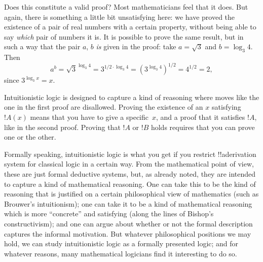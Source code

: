 \documentclass[../../../include/open-logic-chapter]{subfiles}
\begin{document}
Does this constitute a valid proof? Most mathematicians feel that it
does. But again, there is something a little bit unsatisfying here: we
have proved the existence of a pair of real numbers with a certain
property, without being able to say \emph{which} pair of numbers it
is.  It is possible to prove the same result, but in such a way that
the pair $a$, $b$ \emph{is} given in the proof: take $a = \sqrt{3}$
and $b = \log_3 4$. Then
\[
a^b = \sqrt{3}^{\log_3 4} = 3^{1/2 \cdot \log_3 4} = (3^{\log_3
  4})^{1/2} = 4^{1/2}= 2,
\]
since $3^{\log_3 x} = x$.

Intuitionistic logic is designed to capture a kind of reasoning where
moves like the one in the first proof are disallowed. Proving the
existence of an $x$ satisfying~$!A(x)$ means that you have to give a
specific~$x$, and a proof that it satisfies $!A$, like in the second
proof. Proving that $!A$ or $!B$ holds requires that you can prove one
or the other.

Formally speaking, intuitionistic logic is what you get if
you restrict !!a{derivation} system for classical logic in a certain
way. From the mathematical point of view, these are
just formal deductive systems, but, as already noted, they are
intended to capture a kind of mathematical reasoning. One can take this
to be the kind of reasoning that is justified on a certain
philosophical view of mathematics (such as Brouwer's intuitionism);
one can take it to be a kind of mathematical reasoning which is more
``concrete'' and satisfying (along the lines of Bishop's
constructivism); and one can argue about whether or not the formal
description captures the informal motivation. But whatever
philosophical positions we may hold, we can study intuitionistic logic
as a formally presented logic; and for whatever reasons, many
mathematical logicians find it interesting to do so.
\end{document}
